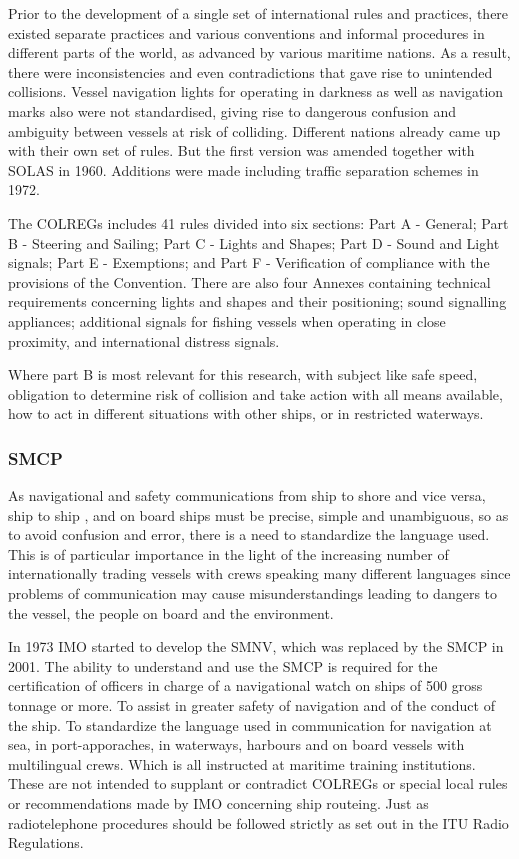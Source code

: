 Prior to the development of a single set of international rules and practices, there existed separate practices and various conventions and informal procedures in different parts of the world, as advanced by various maritime nations. As a result, there were inconsistencies and even contradictions that gave rise to unintended collisions. Vessel navigation lights for operating in darkness as well as navigation marks also were not standardised, giving rise to dangerous confusion and ambiguity between vessels at risk of colliding. Different nations already came up with their own set of rules. But the first version was amended together with \ac{SOLAS} in 1960. Additions were made including traffic separation schemes in 1972.

The \ac{COLREGs} includes 41 rules divided into six sections: Part A - General; Part B - Steering and Sailing; Part C - Lights and Shapes; Part D - Sound and Light signals;  Part E - Exemptions; and Part F - Verification of compliance with the provisions of the Convention. There are also four Annexes containing technical requirements concerning lights and shapes and their positioning; sound signalling appliances; additional signals for fishing vessels when operating in close proximity, and international distress signals.

Where part B is most relevant for this research, with subject like safe speed, obligation to determine risk of collision and take action with all means available, how to act in different situations with other ships, or in restricted waterways. 

\subsubsection{\acf{SMCP}}
As navigational and safety communications from ship to shore and vice versa, ship to ship , and on board ships must be precise, simple and unambiguous, so as to avoid confusion and error, there is a need to standardize the language used. This is of particular importance in the light of the increasing number of internationally trading vessels with crews speaking many different languages since problems of communication may cause misunderstandings leading to dangers to the vessel, the people on board and the environment.

In 1973 \ac{IMO} started to develop the \acf{SMNV}, which was replaced by the \ac{SMCP} in 2001. The ability to understand and use the \ac{SMCP} is required for the certification of officers in charge of a navigational watch on ships of 500 gross tonnage or more. To assist in greater safety of navigation and of the conduct of the ship. To standardize the language used in communication for navigation at sea, in port-apporaches, in waterways, harbours and on board vessels with multilingual crews. Which is all instructed at maritime training institutions. These are not intended to supplant or contradict \ac{COLREGs} or special local rules or recommendations made by IMO concerning ship routeing. Just as radiotelephone procedures should be followed strictly as set out in the ITU Radio Regulations. 

